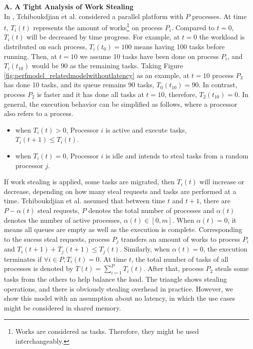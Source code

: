 \noindent \textbf{A. A Tight Analysis of Work Stealing \cite{tchiboukdjian2010tighter,tchiboukdjian2013decentralized}}\\

In \cite{tchiboukdjian2013decentralized}, Tchiboukdjian et al. considered a parallel platform with $P$ processes. At time $t$, $T_{i}(t)$ represents the amount of works\footnote{Works are considered as tasks. Therefore, they might be used interchangeably.} on process $P_{i}$. Compared to $t=0$, $T_{i}(t)$ will be decreased by time progress. For example, at $t=0$ the workload is distributed on each process, $T_{i}(t_{0}) = 100$ means having 100 tasks before running. Then, at $t=10$ we assume 10 tasks have been done on process $P_{i}$, and $T_{i}(t_{10})$ would be $90$ as the remaining tasks. Taking Figure \ref{fig:perfmodel_relatedmodelwithoutlatency} as an example, at $t=10$ process $P_{3}$ has done 10 tasks, and its queue remains 90 tasks, $T_{0}(t_{10}) = 90$. In contrast, process $P_{2}$ is faster and it has done all tasks at $t=10$, therefore, $T_{2}(t_{10}) = 0$. In general, the execution behavior can be simplified as follows, where a processor also refers to a process.

\begin{itemize}
	\item when $T_{i}(t) > 0$, Processor $i$ is active and execute tasks, $T_{i}(t+1) \leq T_{i}(t)$.
	\item when $T_{i}(t) = 0$, Processor $i$ is idle and intends to steal tasks from a random processor $j$.
\end{itemize}

If work stealing is applied, some tasks are migrated, then $T_{i}(t)$ will increase or decrease, depending on how many steal requests and tasks are performed at a time. Tchiboukdjian et al. \cite{tchiboukdjian2010tighter} \cite{tchiboukdjian2013decentralized} assumed that between time $t$ and $t+1$, there are $P - \alpha(t)$ steal requests, $P$ denotes the total number of processes and $\alpha(t)$ denotes the number of active processes, $\alpha(t) \in [0, m]$. When $\alpha(t)=0$, it means all queues are empty as well as the execution is complete. Corresponding to the sucess steal requests, process $P_{j}$ transfers an amount of works to process $P_{i}$ and $T_{i}(t+1) + T_{j}(t+1) \leq T_{j}(t)$. Similarly, when $\alpha(t)=0$, the execution terminates if $\forall i \in P, T_{i}(t) = 0$. At time $t$, the total number of tasks of all processes is denoted by $T(t) = \sum_{i=1}^{P}T_{i}(t)$. After that, process $P_{2}$ steals some tasks from the others to help balance the load. The triangle shows stealing operations, and there is obviously stealing overhead in practice. However, we show this model with an assumption about no latency, in which the use cases might be considered in shared memory.\\

